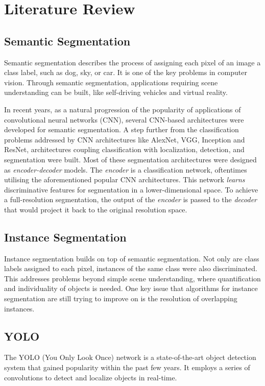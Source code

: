 \documentclass[journal]{IEEEtran}
\begin{document}
\section{Literature Review}
\subsection{Semantic Segmentation}
Semantic segmentation describes the process of assigning each pixel of an image a class label, such as dog, sky, or car. It is one of the key problems in computer vision. Through semantic segmentation, applications requiring scene understanding can be built, like self-driving vehicles and virtual reality. 

In recent years, as a natural progression of the popularity of applications of convolutional neural networks (CNN), several CNN-based architectures were developed for semantic segmentation. A step further from the classification problems addressed by CNN architectures like AlexNet, VGG, Inception and ResNet, architectures coupling classification with localization, detection, and segmentation were built. Most of these segmentation architectures were designed as \textit{encoder-decoder} models. The \textit{encoder} is a classification network, oftentimes utilising the aforementioned popular CNN architectures. This network \textit{learns} discriminative features for segmentation in a lower-dimensional space. To achieve a full-resolution segmentation, the output of the \textit{encoder} is passed to the \textit{decoder} that would project it back to the original resolution space.
\subsection{Instance Segmentation}
Instance segmentation builds on top of semantic segmentation. Not only are class labels assigned to each pixel, instances of the same class were also discriminated. This addresses problems beyond simple scene understanding, where quantification and individuality of objects is needed. One key issue that algorithms for instance segmentation are still trying to improve on is the resolution of overlapping instances.
\subsection{YOLO}
The YOLO (You Only Look Once) network \cite{redmon2016yolo9000} is a state-of-the-art object detection system that gained popularity within the past few years. It employs a series of convolutions to detect and localize objects in real-time.
\end{document}
